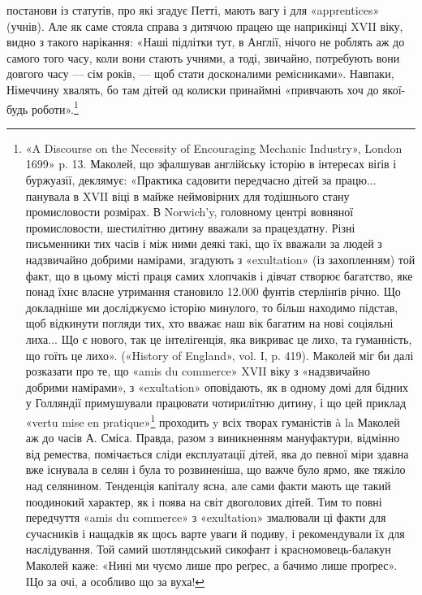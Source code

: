 \parcont{}  %
постанови із статутів, про які згадує Петті, мають вагу і для
«apprentices» (учнів). Але як саме стояла справа з дитячою працею
ще наприкінці XVII віку, видно з такого нарікання: «Наші
підлітки тут, в Англії, нічого не роблять аж до самого того часу,
коли вони стають учнями, а тоді, звичайно, потребують вони довгого
часу — сім років, — щоб стати досконалими ремісниками».
Навпаки, Німеччину хвалять, бо там дітей од колиски принаймні
«привчають хоч до якої-будь роботи».\footnote{
«A Discourse on the Necessity of Encouraging Mechanic Industry»,
London 1699» p. 13. Маколей, що зфалшував англійську історію в інтересах
віґів і буржуазії, деклямує: «Практика садовити передчасно
дітей за працю... панувала в XVII віці в майже неймовірних для тодішнього
стану промисловости розмірах. В Norwich’y, головному центрі
вовняної промисловости, шестилітню дитину вважали за працездатну.
Різні письменники тих часів і між ними деякі такі, що їх вважали за людей
з надзвичайно добрими намірами, згадують з «exultation» (із захопленням)
той факт, що в цьому місті праця самих хлопчаків і дівчат створює
багатство, яке понад їхнє власне утримання становило 12.000 фунтів
стерлінґів річно. Що докладніше ми досліджуємо історію минулого, то
більш находимо підстав, щоб відкинути погляди тих, хто вважає наш
вік багатим на нові соціяльні лиха... Що є нового, так це інтелігенція,
яка викриває це лихо, та гуманність, що гоїть це лихо». («History of
England», vol. I, p. 419). Маколей міг би далі розказати про те, що «amis
du commerce» XVII віку з «надзвичайно добрими намірами», з «exultation»
оповідають, як в одному домі для бідних у Голляндії примушували
працювати чотирилітню дитину, і що цей приклад «vertu mise en pratique»\footnote*{
— практичної чесноти. Ред.
}
проходить y всіх творах гуманістів à la Маколей аж до часів
А. Сміса. Правда, разом з виникненням мануфактури, відмінно від ремества,
помічається сліди експлуатації дітей, яка до певної міри здавна
вже існувала в селян і була то розвиненіша, що важче було ярмо,
яке тяжіло над селянином. Тенденція капіталу ясна, але сами факти
мають ще такий поодинокий характер, як і поява на світ двоголових
дітей. Тим то повні передчуття «amis du commerce» з «exultation» змалювали
ці факти для сучасників і нащадків як щось варте уваги й подиву,
і рекомендували їх для наслідування. Той самий шотляндський сикофант
і красномовець-балакун Маколей каже: «Нині ми чуємо лише про реґрес,
а бачимо лише проґрес». ІЦо за очі, а особливо що за вуха!
}

